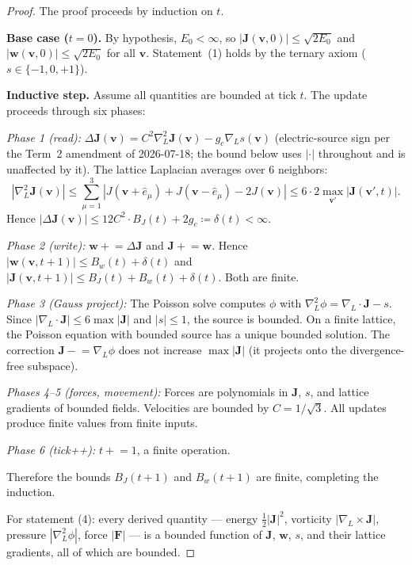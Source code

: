 \documentclass[11pt]{article}
\theoremstyle{tight}
\theoremstyle{plainroman}
\begin{document}
\begin{proof}
The proof proceeds by induction on $t$.

\textbf{Base case ($t=0$).}
By hypothesis, $E_0<\infty$, so $|\mathbf J(\mathbf v,0)|\le\sqrt{2E_0}$ and $|\mathbf w(\mathbf v,0)|\le\sqrt{2E_0}$ for all $\mathbf v$.
Statement~(1) holds by the ternary axiom ($s\in\{-1,0,+1\}$).

\textbf{Inductive step.}
Assume all quantities are bounded at tick $t$.
The update proceeds through six phases:

\emph{Phase 1 (read):}
$\Delta\mathbf J(\mathbf v)=C^2\nabla_L^2\mathbf J(\mathbf v)-g_c\nabla_L s(\mathbf v)$
(electric-source sign per the Term~2 amendment of 2026-07-18; the bound below uses
$|{\cdot}|$ throughout and is unaffected by it).
The lattice Laplacian averages over 6 neighbors:
\[
|\nabla_L^2\mathbf J(\mathbf v)|\le\sum_{\mu=1}^{3}|J(\mathbf v+\hat e_\mu)+J(\mathbf v-\hat e_\mu)-2J(\mathbf v)|\le 6\cdot 2\max_{\mathbf v'}|\mathbf J(\mathbf v',t)|.
\]
Hence $|\Delta\mathbf J(\mathbf v)|\le 12C^2\cdot B_J(t)+2g_c\coloneqq\delta(t)<\infty$.

\emph{Phase 2 (write):}
$\mathbf w\mathrel{+}=\Delta\mathbf J$ and $\mathbf J\mathrel{+}=\mathbf w$.
Hence $|\mathbf w(\mathbf v,t+1)|\le B_w(t)+\delta(t)$ and $|\mathbf J(\mathbf v,t+1)|\le B_J(t)+B_w(t)+\delta(t)$.
Both are finite.

\emph{Phase 3 (Gauss project):}
The Poisson solve computes $\phi$ with $\nabla_L^2\phi=\nabla_L\!\cdot\!\mathbf J-s$.
Since $|\nabla_L\!\cdot\!\mathbf J|\le 6\max|\mathbf J|$ and $|s|\le 1$, the source is bounded.
On a finite lattice, the Poisson equation with bounded source has a unique bounded solution.
The correction $\mathbf J\mathrel{-}=\nabla_L\phi$ does not increase $\max|\mathbf J|$ (it projects onto the divergence-free subspace).

\emph{Phases 4--5 (forces, movement):}
Forces are polynomials in $\mathbf J$, $s$, and lattice gradients of bounded fields.
Velocities are bounded by $C=1/\sqrt{3}$.
All updates produce finite values from finite inputs.

\emph{Phase 6 (tick++):}
$t\mathrel{+}=1$, a finite operation.

Therefore the bounds $B_J(t+1)$ and $B_w(t+1)$ are finite, completing the induction.

For statement (4): every derived quantity --- energy $\frac{1}{2}|\mathbf J|^2$, vorticity $|\nabla_L\times\mathbf J|$, pressure $|\nabla_L^2\phi|$, force $|\mathbf F|$ --- is a bounded function of $\mathbf J$, $\mathbf w$, $s$, and their lattice gradients, all of which are bounded.
\end{proof}
\end{document}
